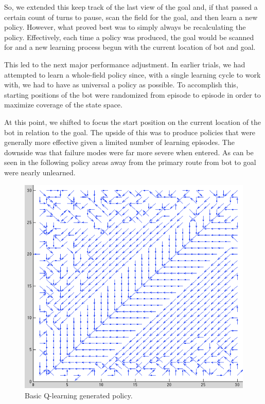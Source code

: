 \documentclass{aiaa-tc}%
\begin{document}
So, we extended this keep track of the last view of the goal and, if
that passed a certain count of turns to pause, scan the field for the
goal, and then learn a new policy. However, what proved best was to
simply always be recalculating the policy. Effectively, each time a
policy was produced, the goal would be scanned for and a new learning
process begun with the current location of bot and goal.

This led to the next major performance adjustment. In earlier trials,
we had attempted to learn a whole-field policy since, with a single
learning cycle to work with, we had to have as universal a policy as
possible. To accomplish this, starting positions of the bot were
randomized from episode to episode in order to maximize coverage of
the state space.

At this point, we shifted to focus the start position
on the current location of the bot in relation to the goal. The upside
of this was to produce policies that were generally more effective
given a limited number of learning episodes. The downside was that
failure modes were far more severe when entered. As can be seen in the
following policy areas away from the primary route from bot to goal
were nearly unlearned.

\vspace{.3in}

\begin{figure}[htbp]
  \centering
  \includegraphics[width=\linewidth]{images/BasicPolicy.png} 
  \caption{Basic Q-learning generated policy.}
  \label{fig:basicQ}
\end{figure}
\clearpage
\end{document}

